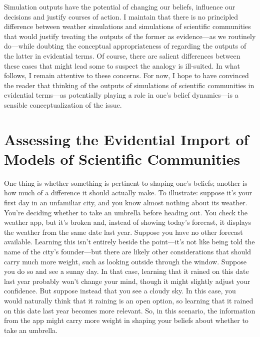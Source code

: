 \documentclass{article}
\begin{document}
Simulation outputs have the potential of changing our beliefs, influence our decisions and justify courses of action. I maintain that there is no principled difference between weather simulations and simulations of scientific communities that would justify treating the outputs of the former as evidence—as we routinely do—while doubting the conceptual appropriateness of regarding the outputs of the latter in evidential terms. Of course, there are salient differences between these cases that might lead some to suspect the analogy is ill-suited. In what follows, I remain attentive to these concerns. For now, I hope to have convinced the reader that thinking of the outputs of simulations of scientific communities in evidential terms—as potentially playing a role in one's belief dynamics—is a sensible conceptualization of the issue.

\section{Assessing the Evidential Import of Models of Scientific Communities}

One thing is whether something is pertinent to shaping one's beliefs; another is how much of a difference it should actually make. To illustrate: suppose it's your first day in an unfamiliar city, and you know almost nothing about its weather. You're deciding whether to take an umbrella before heading out. You check the weather app, but it's broken and, instead of showing today's forecast, it displays the weather from the same date last year. Suppose you have no other forecast available. Learning this isn't entirely beside the point—it's not like being told the name of the city's founder—but there are likely other considerations that should carry much more weight, such as looking outside through the window. Suppose you do so and see a sunny day. In that case, learning that it rained on this date last year probably won't change your mind, though it might slightly adjust your confidence. But suppose instead that you see a cloudy sky. In this case, you would naturally think that it raining is an open option, so learning that it rained on this date last year becomes more relevant. So, in this scenario, the information from the app might carry more weight in shaping your beliefs about whether to take an umbrella.
\end{document}
